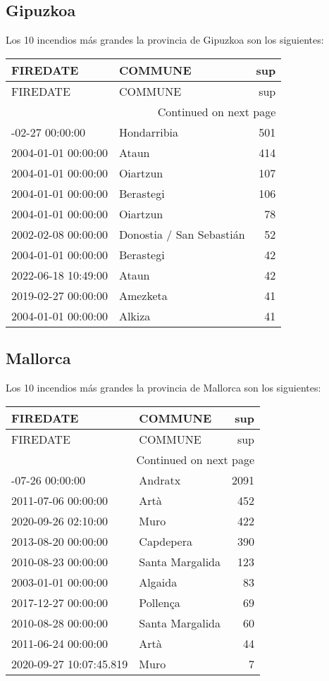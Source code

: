 \documentclass[spanish]{article}
\begin{document}
\subsection{Gipuzkoa}
Los 10 incendios más grandes la provincia de Gipuzkoa son los siguientes:
\begin{longtable}{llr}
\toprule
FIREDATE & COMMUNE & sup \\
\midrule
\endfirsthead
\toprule
FIREDATE & COMMUNE & sup \\
\midrule
\endhead
\midrule
\multicolumn{3}{r}{Continued on next page} \\
\midrule
\endfoot
\bottomrule
\endlastfoot
2010-02-27 00:00:00 & Hondarribia & 501 \\
2004-01-01 00:00:00 & Ataun & 414 \\
2004-01-01 00:00:00 & Oiartzun & 107 \\
2004-01-01 00:00:00 & Berastegi & 106 \\
2004-01-01 00:00:00 & Oiartzun & 78 \\
2002-02-08 00:00:00 & Donostia / San Sebastián & 52 \\
2004-01-01 00:00:00 & Berastegi & 42 \\
2022-06-18 10:49:00 & Ataun & 42 \\
2019-02-27 00:00:00 & Amezketa & 41 \\
2004-01-01 00:00:00 & Alkiza & 41 \\
\end{longtable}


\subsection{Mallorca}
Los 10 incendios más grandes la provincia de Mallorca son los siguientes:
\begin{longtable}{llr}
\toprule
FIREDATE & COMMUNE & sup \\
\midrule
\endfirsthead
\toprule
FIREDATE & COMMUNE & sup \\
\midrule
\endhead
\midrule
\multicolumn{3}{r}{Continued on next page} \\
\midrule
\endfoot
\bottomrule
\endlastfoot
2013-07-26 00:00:00 & Andratx & 2091 \\
2011-07-06 00:00:00 & Artà & 452 \\
2020-09-26 02:10:00 & Muro & 422 \\
2013-08-20 00:00:00 & Capdepera & 390 \\
2010-08-23 00:00:00 & Santa Margalida & 123 \\
2003-01-01 00:00:00 & Algaida & 83 \\
2017-12-27 00:00:00 & Pollença & 69 \\
2010-08-28 00:00:00 & Santa Margalida & 60 \\
2011-06-24 00:00:00 & Artà & 44 \\
2020-09-27 10:07:45.819 & Muro & 7 \\
\end{longtable}
\end{document}
